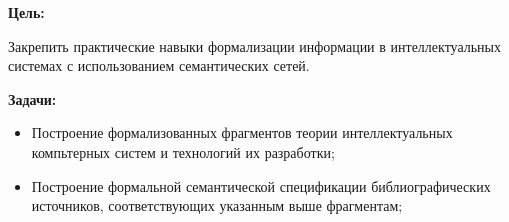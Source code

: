 
\textbf{Цель:}

Закрепить практические навыки формализации информации в интеллектуальных системах с использованием семантических сетей.
\bigskip

\textbf{Задачи:}

\begin{itemize}
    \item Построение формализованных фрагментов теории интеллектуальных компьтерных систем и технологий их разработки;
    \item Построение формальной семантической спецификации библиографических источников, соответствующих указанным выше фрагментам;
\end{itemize}